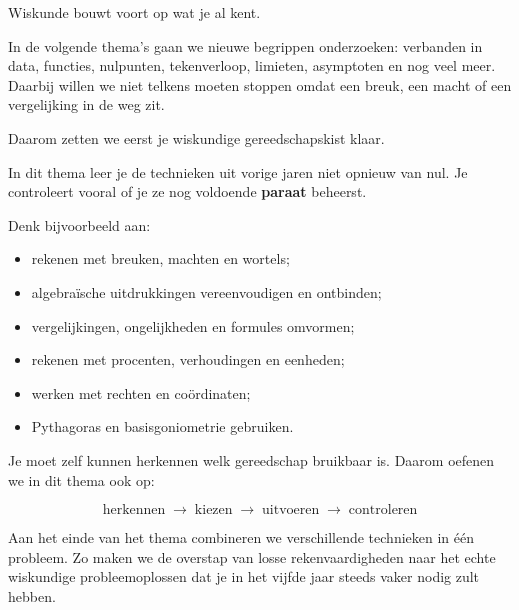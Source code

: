 \documentclass{xourse}
\begin{document}
\begin{hoofdstukoverzicht}
\end{hoofdstukoverzicht}

\begin{themaintro}{}

Wiskunde bouwt voort op wat je al kent.

In de volgende thema's gaan we nieuwe begrippen onderzoeken:
verbanden in data, functies, nulpunten, tekenverloop, limieten,
asymptoten en nog veel meer. Daarbij willen we niet telkens moeten
stoppen omdat een breuk, een macht of een vergelijking in de weg zit.

Daarom zetten we eerst je wiskundige gereedschapskist klaar.

In dit thema leer je de technieken uit vorige jaren niet opnieuw van nul.
Je controleert vooral of je ze nog voldoende \textbf{paraat} beheerst.

Denk bijvoorbeeld aan:

\begin{itemize}
    \item rekenen met breuken, machten en wortels;
    \item algebraïsche uitdrukkingen vereenvoudigen en ontbinden;
    \item vergelijkingen, ongelijkheden en formules omvormen;
    \item rekenen met procenten, verhoudingen en eenheden;
    \item werken met rechten en coördinaten;
    \item Pythagoras en basisgoniometrie gebruiken.
\end{itemize}



Je moet zelf kunnen herkennen welk gereedschap bruikbaar is.
Daarom oefenen we in dit thema ook op:

\[
\boxed{
\text{herkennen}
\;\longrightarrow\;
\text{kiezen}
\;\longrightarrow\;
\text{uitvoeren}
\;\longrightarrow\;
\text{controleren}
}
\]

Aan het einde van het thema combineren we verschillende technieken
in één probleem. Zo maken we de overstap van losse rekenvaardigheden
naar het echte wiskundige probleemoplossen dat je in het vijfde jaar
steeds vaker nodig zult hebben.
\end{themaintro}
\end{document}
